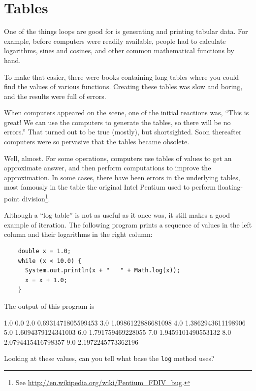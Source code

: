 \section{Tables}

One of the things loops are good for is generating and printing
tabular data.  For example, before computers were readily
available, people had to calculate logarithms,
sines and cosines, and other common mathematical functions
by hand.

To make that easier, there were books containing long tables
where you could find the values of various functions.
Creating these tables was slow and boring, and the results
were full of errors.

When computers appeared on the scene, one of the initial reactions
was, ``This is great!  We can use the computers to generate the
tables, so there will be no errors.''  That turned out to be true
(mostly), but shortsighted.  Soon thereafter computers were so
pervasive that the tables became obsolete.

Well, almost.  For some operations, computers use tables of values to
get an approximate answer, and then perform computations to improve
the approximation.  In some cases, there have been errors in the
underlying tables, most famously in the table the original Intel
Pentium used to perform floating-point division\footnote{See
  \url{http://en.wikipedia.org/wiki/Pentium_FDIV_bug}.}.


Although a ``log table'' is not as useful as it once was, it still
makes a good example of iteration.  The following program prints a
sequence of values in the left column and their logarithms in the
right column:

\begin{lstlisting}
    double x = 1.0;
    while (x < 10.0) {
      System.out.println(x + "   " + Math.log(x));
      x = x + 1.0;
    }
\end{lstlisting}
%
The output of this program is

\begin{stdout}
1.0   0.0
2.0   0.6931471805599453
3.0   1.0986122886681098
4.0   1.3862943611198906
5.0   1.6094379124341003
6.0   1.791759469228055
7.0   1.9459101490553132
8.0   2.0794415416798357
9.0   2.1972245773362196
\end{stdout}
%
Looking at these values, can you tell what base the {\tt log}
method uses?

